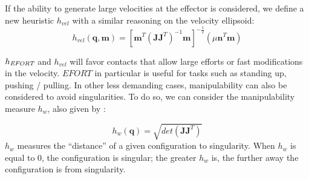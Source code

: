 If the ability to generate large velocities at the effector is considered, we define a new heuristic $h_{vel}$ with a similar reasoning on the velocity ellipsoid:
\begin{equation}
h_{vel}(\mathbf{q}, \mathbf{m}) = [\mathbf{m}^{T}(\mathbf{J}\mathbf{J}^T)^{-1}\mathbf{m}]^{-\frac{1}{2}} ( \mu \mathbf{n}^T \mathbf{m})
\end{equation}

$h_{\textrm{\it EFORT}}$ and $h_{vel}$ will favor contacts that allow large efforts or fast modifications in the velocity.
$EFORT$ in particular is useful for tasks such as standing up, pushing / pulling.
In other less demanding cases, manipulability can also be considered to avoid singularities.
To do so, we can consider the manipulability measure $h_{w}$, also given by \citeauthor{Yoshikawa1984}:

\begin{equation} \label{ellipsoid}
h_{w}(\mathbf{q}) = \sqrt{det(\mathbf{J}\mathbf{J}^T)}
\end{equation}
$h_{w}$ measures the ``distance'' of a given configuration to singularity. When $h_{w}$ is equal to 0, the configuration is singular;
the greater $h_{w}$ is, the further away the configuration is from singularity.










